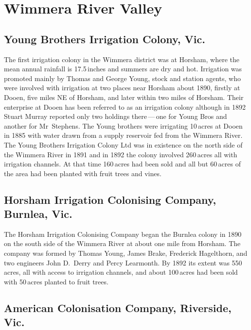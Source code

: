 \section*{Wimmera River Valley}

\subsection*{Young Brothers Irrigation Colony, Vic.}

The first irrigation colony in the Wimmera district was at Horsham,
where the mean annual rainfall is 17.5\,inches and summers are dry and
hot.  Irrigation was promoted mainly by Thomas and George Young,
 stock
and station agents, who were involved with irrigation at two places
near Horsham about 1890, firstly at Dooen,   five
miles NE of Horsham, and later within two miles of Horsham.  Their
enterprise at Dooen has been referred to as an irrigation colony
although in 1892 Stuart Murray reported only two holdings
there\,---\,one for Young Bros and another for Mr~Stephens.  The Young
brothers were irrigating 10\,acres at Dooen in 1885 with water drawn
from a supply reservoir fed from the Wimmera River.  The Young
Brothers Irrigation Colony Ltd was in existence on the north side of
the Wimmera River in 1891 and in 1892 the colony involved 260\,acres
all with irrigation channels.  At that time 160\,acres had been sold
and all but 60\,acres of the area had been planted with fruit trees
and vines.

\subsection*{Horsham Irrigation Colonising Company, Burnlea, Vic.}

The Horsham Irrigation Colonising Company began the Burnlea colony in
1890 on the south side of the Wimmera River at about one mile from
Horsham.  The company was formed by Thomas Young, James Brake,
Frederick Hagelthorn, and two engineers John D.~Derry and Percy
Learmonth.  By 1892 its extent was 550\,acres, all with access to
irrigation channels, and about 100\,acres had been sold with 50\,acres
planted to fruit trees.

\subsection*{American Colonisation Company, Riverside, Vic.}

